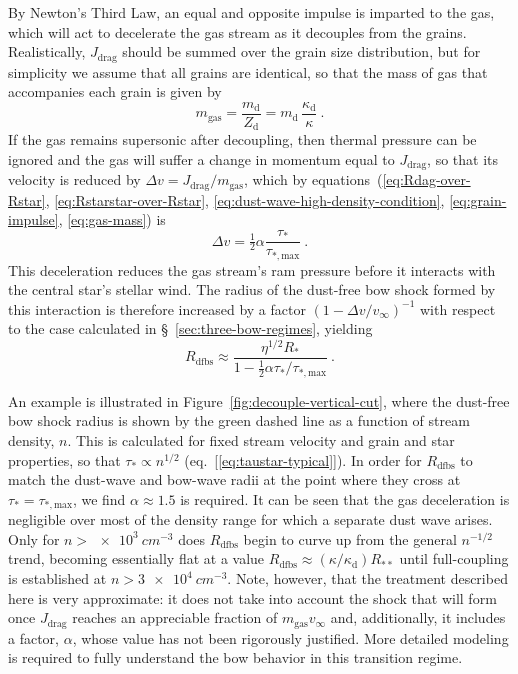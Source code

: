 \message{ !name(dusty-bow-wave.tex)}\documentclass[useAMS, usenatbib, a4paper]{mnras}
\newcommand{\grain}{\ensuremath{_{\text{d}}}}
\newcommand\drag{\ensuremath{_{\text{drag}}}}
\newcommand\starstar{\ensuremath{_{**}}}
\begin{document}
By Newton's Third Law, an equal and opposite impulse is imparted to
the gas, which will act to decelerate the gas stream as it decouples
from the grains.  Realistically, \(J\drag\) should be summed over the
grain size distribution, but for simplicity we assume that all grains
are identical, so that the mass of gas that accompanies each grain is
given by
\begin{equation}
  \label{eq:gas-mass}
  m_{\text{gas}} = \frac{m\grain}{Z\grain} =  m\grain \, \frac{\kappa\grain}{\kappa} \ . 
\end{equation}
If the gas remains supersonic after decoupling, then thermal pressure
can be ignored and the gas will suffer a change in momentum equal to
\(J\drag\), so that its velocity is reduced by
\(\Delta v = J\drag / m_{\text{gas}}\), which by
equations~(\ref{eq:Rdag-over-Rstar}, \ref{eq:Rstarstar-over-Rstar},
\ref{eq:dust-wave-high-density-condition}, \ref{eq:grain-impulse},
\ref{eq:gas-mass}) is
\begin{equation}
  \label{eq:gas-dv}
  \Delta v = \tfrac12 \alpha \frac{\tau_*}{\tau_{*, \text{max}}} \ .
\end{equation}
This deceleration reduces the gas stream's ram pressure before it
interacts with the central star's stellar wind.  The radius of the
dust-free bow shock formed by this interaction is therefore increased
by a factor \((1 - \Delta v / v_\infty)^{-1}\) with respect to the case
calculated in \S~\ref{sec:three-bow-regimes}, yielding
\begin{equation}
  \label{eq:gas-free-bow-shock}
  R_{\text{dfbs}} \approx \frac{\eta^{1/2} R_*}{1 - \tfrac12 \alpha \tau_* / \tau_{*, \text{max}}} \ .
\end{equation}

An example is illustrated in Figure~\ref{fig:decouple-vertical-cut},
where the dust-free bow shock radius is shown by the green dashed line
as a function of stream density, \(n\).  This is calculated for fixed
stream velocity and grain and star properties, so that
\(\tau_* \propto n^{1/2}\) (eq.~[\ref{eq:taustar-typical}]).  In order for
\(R_{\text{dfbs}}\) to match the dust-wave and bow-wave radii at the
point where they cross at \(\tau_* = \tau_{*, \text{max}}\), we find
\(\alpha \approx 1.5\) is required.  It can be seen that the gas deceleration is
negligible over most of the density range for which a separate dust
wave arises.  Only for \(n > \SI{e3}{cm^{-3}}\) does
\(R_{\text{dfbs}}\) begin to curve up from the general \(n^{-1/2}\)
trend, becoming essentially flat at a value
\(R_{\text{dfbs}} \approx (\kappa/\kappa\grain) R\starstar\) until full-coupling is
established at \(n > \SI{3e4}{cm^{-3}}\).  Note, however, that the
treatment described here is very approximate: it does not take into
account the shock that will form once \(J\drag\) reaches an
appreciable fraction of \(m_{\text{gas}} v_\infty\) and, additionally, it
includes a factor, \(\alpha\), whose value has not been rigorously
justified.  More detailed modeling is required to fully understand the
bow behavior in this transition regime.
\end{document}
